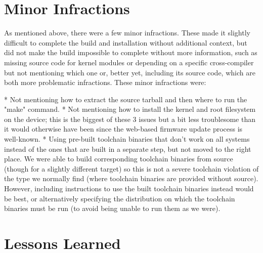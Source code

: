 \section{Minor Infractions}

As mentioned above, there were a few minor infractions.  These made it slightly
difficult to complete the build and installation without additional context, but
did not make the build impossible to complete without more information, such as
missing source code for kernel modules or depending on a specific cross-compiler
but not mentioning which one or, better yet, including its source code, which
are both more problematic infractions.  These minor infractions were:


* Not mentioning how to extract the source tarball and then where to run the
  "make" command.
* Not mentioning how to install the kernel and root filesystem on the device;
  this is the biggest of these 3 issues but a bit less troublesome than it would
  otherwise have been since the web-based firmware update process is well-known.
* Using pre-built toolchain binaries that don't work on all systems instead of
  the ones that are built in a separate step, but not moved to the right place.
  We were able to build corresponding toolchain binaries from source (though
  for a slightly different target) so this is not a severe toolchain violation
  of the type we normally find (where toolchain binaries are provided without
  source).  However, including instructions to use the built toolchain binaries
  instead would be best, or alternatively specifying the distribution on which
  the toolchain binaries must be run (to avoid being unable to run them as we
  were).

\section{Lessons Learned}


